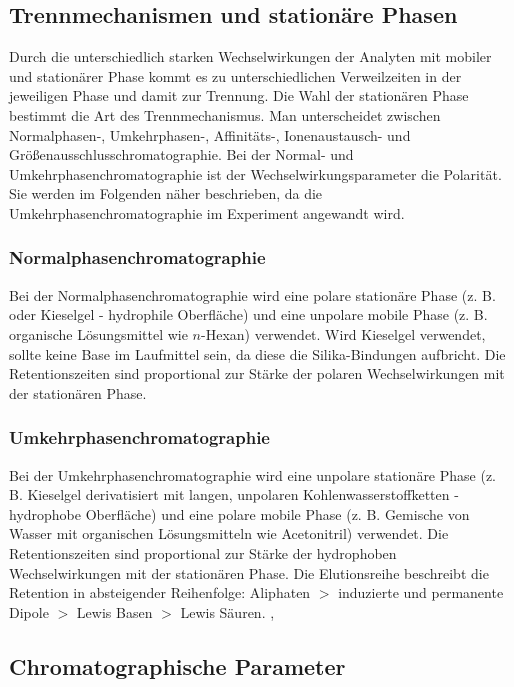   \subsection{Trennmechanismen und stationäre Phasen}
    
    Durch die unterschiedlich starken Wechselwirkungen der Analyten mit mobiler und stationärer Phase kommt es zu unterschiedlichen Verweilzeiten in der jeweiligen Phase und damit zur Trennung. Die Wahl der stationären Phase bestimmt die Art des Trennmechanismus. Man unterscheidet zwischen Normalphasen-, Umkehrphasen-, Affinitäts-, Ionenaustausch- und Größenausschlusschromatographie. Bei der Normal- und Umkehrphasenchromatographie ist der Wechselwirkungsparameter die Polarität. Sie werden im Folgenden näher beschrieben, da die Umkehrphasenchromatographie im Experiment angewandt wird. 
    
      \subsubsection{Normalphasenchromatographie}
      
        Bei der Normalphasenchromatographie wird eine polare stationäre Phase (z. B.  oder Kieselgel - hydrophile Oberfläche) und eine unpolare mobile Phase (z. B. organische Lösungsmittel wie $n$-Hexan) verwendet. Wird Kieselgel verwendet, sollte keine Base im Laufmittel sein, da diese die Silika-Bindungen aufbricht. Die Retentionszeiten sind proportional zur Stärke der polaren Wechselwirkungen mit der stationären Phase. \citep{SkriptHPLC}
        
      \subsubsection{Umkehrphasenchromatographie}
        
        Bei der Umkehrphasenchromatographie wird eine unpolare stationäre Phase (z. B. Kieselgel derivatisiert mit langen, unpolaren Kohlenwasserstoffketten - hydrophobe Oberfläche) und eine polare mobile Phase (z. B. Gemische von Wasser mit organischen Lösungsmitteln wie Acetonitril) verwendet. Die Retentionszeiten sind proportional zur Stärke der hydrophoben Wechselwirkungen mit der stationären Phase. Die Elutionsreihe beschreibt die Retention in absteigender Reihenfolge: Aliphaten $>$ induzierte und permanente Dipole $>$ Lewis Basen $>$ Lewis Säuren. \citep{Versuchsvorschrift}, \citep[S. 162]{Taschenatlas}
    
  \subsection{Chromatographische Parameter} \label{sec:ChromatographischeParameter}
    
